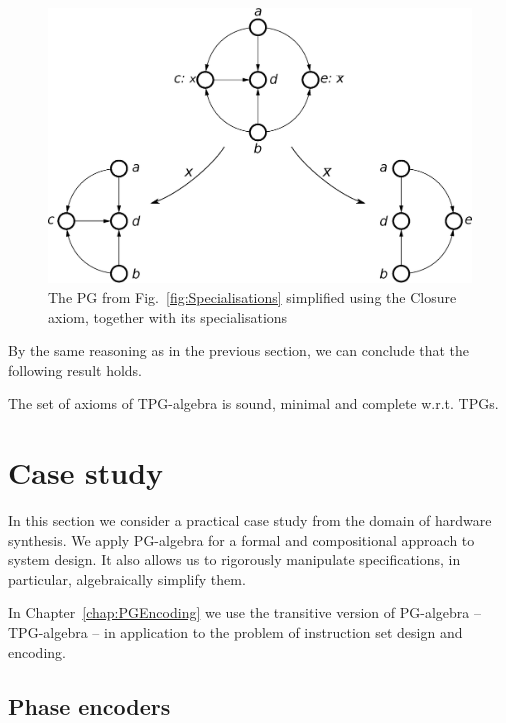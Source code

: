 \begin{figure}[t]
\begin{centering}
\includegraphics[width=0.85\columnwidth]{fig/cpog_projections_2_trans}
\par\end{centering}
\caption{The PG from Fig.~\ref{fig:Specialisations} simplified using the
Closure axiom, together with its specialisations\label{fig:The-simplified-CG-from}}
\end{figure}


By the same reasoning as in the previous section, we can conclude
that the following result holds.
\begin{thm}
 The set of axioms of TPG-algebra
is sound, minimal and complete w.r.t. TPGs.
\end{thm}

\section{Case study}

In this section we consider a practical case study from the domain of hardware
synthesis. We apply PG-algebra for a
formal and compositional approach to system design. It also allows us to rigorously manipulate specifications,
in particular, algebraically simplify them.

In Chapter~\ref{chap:PGEncoding} we use the transitive version of PG-algebra -- TPG-algebra --
in application to the problem of instruction set design and encoding.

\subsection{Phase encoders\label{subsect:PhaseEncoders}}

